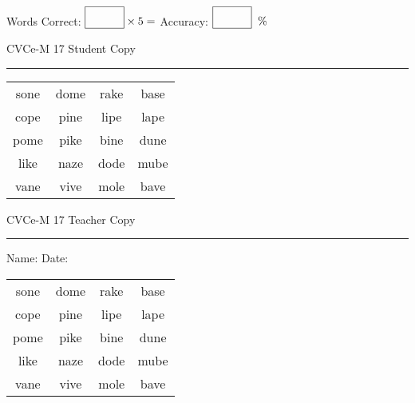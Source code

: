 \documentclass{memoir}
\begin{document}
\small

Words Correct: $\fbox{\phantom{\huge 100}} \times 5 = $ Accuracy: $\fbox{\phantom{\huge 100}}\;\; \%$ 

\vfill

\newpage


\footnotesize \noindent
CVCe-M 17 \hfill Student Copy
\smallskip
\hrule

\Large

\setlength{\tabcolsep}{14pt}
\def\arraystretch{2}

{\selectfont


\begin{vplace}[0.5]
\begin{center}
\begin{tabular}{cccc}
sone & dome & rake & base \\
cope & pine & lipe & lape \\
pome & pike & bine & dune \\
like & naze & dode & mube \\
vane & vive & mole & bave \\
\end{tabular}
\end{center}
\end{vplace}

}

\newpage

\footnotesize \noindent
CVCe-M 17 \hfill Teacher Copy
\smallskip
\hrule

\small

\vfill

\noindent
Name: \underline{\hspace{1.75in}} \hfill Date: \underline{\hspace{1in}}

\Large

{\selectfont


\begin{vplace}[0.5]
\begin{center}
\begin{tabular}{cccc}
sone & dome & rake & base \\
cope & pine & lipe & lape \\
pome & pike & bine & dune \\
like & naze & dode & mube \\
vane & vive & mole & bave \\
\end{tabular}
\end{center}
\end{vplace}



}
\end{document}
